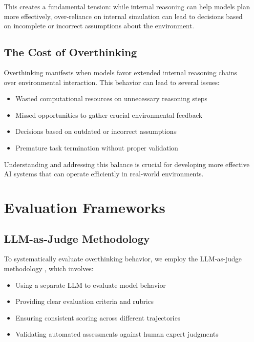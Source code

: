 This creates a fundamental tension: while internal reasoning can help models plan more effectively, over-reliance on internal simulation can lead to decisions based on incomplete or incorrect assumptions about the environment.

\subsection{The Cost of Overthinking}
Overthinking manifests when models favor extended internal reasoning chains over environmental interaction. This behavior can lead to several issues:
\begin{itemize}
    \item Wasted computational resources on unnecessary reasoning steps
    \item Missed opportunities to gather crucial environmental feedback
    \item Decisions based on outdated or incorrect assumptions
    \item Premature task termination without proper validation
\end{itemize}

Understanding and addressing this balance is crucial for developing more effective AI systems that can operate efficiently in real-world environments.

\section{Evaluation Frameworks}
\label{sec:frameworks}

\subsection{LLM-as-Judge Methodology}
To systematically evaluate overthinking behavior, we employ the LLM-as-judge methodology \cite{zheng2023judgingllmasajudgemtbenchchatbot}, which involves:
\begin{itemize}
    \item Using a separate LLM to evaluate model behavior
    \item Providing clear evaluation criteria and rubrics
    \item Ensuring consistent scoring across different trajectories
    \item Validating automated assessments against human expert judgments
\end{itemize}

